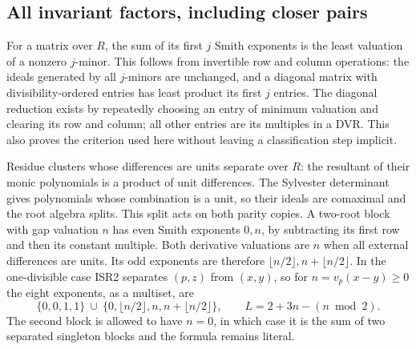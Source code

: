\documentclass[11pt]{article}
\begin{document}
\subsection{All invariant factors, including closer pairs}
For a matrix over $R$, the sum of its first $j$ Smith exponents is
the least valuation of a nonzero $j$-minor. This follows from invertible
row and column operations: the ideals generated by all $j$-minors
are unchanged, and a diagonal matrix with divisibility-ordered entries
has least product its first $j$ entries. The diagonal reduction exists
by repeatedly choosing an entry of minimum valuation and clearing its
row and column; all other entries are its multiples in a DVR. This
also proves the criterion used here without leaving a classification
step implicit.

Residue clusters whose differences are units separate over $R$: the
resultant of their monic polynomials is a product of unit differences.
The Sylvester determinant gives polynomials whose combination is a
unit, so their ideals are comaximal and the root algebra splits.
This split acts on both parity copies. A two-root block with gap
valuation $n$ has even Smith exponents $0,n$, by subtracting its
first row and then its constant multiple. Both derivative valuations
are $n$ when all external differences are units. Its odd exponents
are therefore $\lfloor n/2\rfloor,n+\lfloor n/2\rfloor$.
In the one-divisible case ISR2 separates $(p,z)$ from $(x,y)$, so
for $n=v_p(x-y)\ge0$ the eight exponents, as a multiset, are
\begin{equation}
 \{0,0,1,1\}\ \cup\
 \{0,\lfloor n/2\rfloor,n,n+\lfloor n/2\rfloor\},\qquad
 L=2+3n-(n\bmod2).                                      \tag{ISR16}
\end{equation}
The second block is allowed to have $n=0$, in which case it is the
sum of two separated singleton blocks and the formula remains literal.
\end{document}
